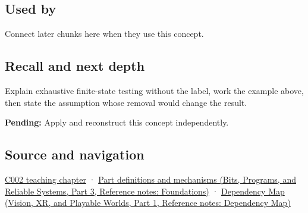 \subsection{Used by}\label{appendix-05db24ccc28a-used-by}

\hypertarget{appendix-05db24ccc28a-used-by}{}

Connect later chunks here when they use this concept.

\subsection{Recall and next depth}\label{appendix-05db24ccc28a-recall-and-next-depth}

\hypertarget{appendix-05db24ccc28a-recall-and-next-depth}{}

Explain exhaustive finite-state testing without the label, work the example above, then state the assumption whose removal would change the result.

\textbf{Pending:} Apply and reconstruct this concept independently.

\subsection{Source and navigation}\label{appendix-05db24ccc28a-source-and-navigation}

\hypertarget{appendix-05db24ccc28a-source-and-navigation}{}

\hyperref[01-foundations-i-ch001-arithmetic-becomes-a-policy]{C002 teaching chapter} · \href{../01-Bits-Programs-and-Reliable-Systems-P03/main.pdf\#appendix-fd090d982a15}{Part definitions and mechanisms (Bits, Programs, and Reliable Systems, Part 3, Reference notes: Foundations)} · \href{../07-Vision-XR-and-Playable-Worlds-P01/main.pdf\#appendix-4ad47bdd269a}{Dependency Map (Vision, XR, and Playable Worlds, Part 1, Reference notes: Dependency Map)}
